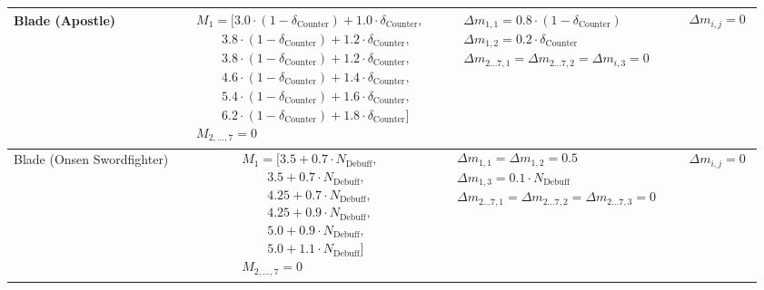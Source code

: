 \documentclass[twocolumn,10pt]{article}
\begin{document}
\begin{landscape}
\begin{longtable}{lccc}
Blade (Apostle) &
$\begin{aligned}
& M_1 = [3.0 \cdot (1-\delta_{\text{Counter}}) + 1.0 \cdot \delta_{\text{Counter}},\\
& \qquad 3.8 \cdot (1-\delta_{\text{Counter}}) + 1.2 \cdot \delta_{\text{Counter}},\\
& \qquad 3.8 \cdot (1-\delta_{\text{Counter}}) + 1.2 \cdot \delta_{\text{Counter}},\\
& \qquad 4.6 \cdot (1-\delta_{\text{Counter}}) + 1.4 \cdot \delta_{\text{Counter}},\\
& \qquad 5.4 \cdot (1-\delta_{\text{Counter}}) + 1.6 \cdot \delta_{\text{Counter}},\\
& \qquad 6.2 \cdot (1-\delta_{\text{Counter}}) + 1.8 \cdot \delta_{\text{Counter}}] \\
& M_{2,\dots,7} = 0
\end{aligned}$ &
$\begin{aligned}
& \Delta m_{1,1} = 0.8 \cdot (1-\delta_{\text{Counter}})\\
& \Delta m_{1,2} = 0.2 \cdot \delta_{\text{Counter}}\\
& \Delta m_{2\dots7,1} = \Delta m_{2\dots7,2} = \Delta m_{i,3} = 0
\end{aligned}$ &
$\begin{aligned}
& \Delta m_{i,j} = 0
\end{aligned}$ \\
\midrule

Blade (Onsen Swordfighter) &
$\begin{aligned}
& M_1 = [3.5 + 0.7 \cdot N_{\text{Debuff}},\\
& \qquad 3.5 + 0.7 \cdot N_{\text{Debuff}},\\
& \qquad 4.25 + 0.7 \cdot N_{\text{Debuff}},\\
& \qquad 4.25 + 0.9 \cdot N_{\text{Debuff}},\\
& \qquad 5.0 + 0.9 \cdot N_{\text{Debuff}},\\
& \qquad 5.0 + 1.1 \cdot N_{\text{Debuff}}] \\
& M_{2,\dots,7} = 0
\end{aligned}$ &
$\begin{aligned}
& \Delta m_{1,1} = \Delta m_{1,2} = 0.5 \\
& \Delta m_{1,3} = 0.1 \cdot N_{\text{Debuff}}\\
& \Delta m_{2\dots7,1} = \Delta m_{2\dots7,2} = \Delta m_{2\dots7,3} = 0
\end{aligned}$ &
$\begin{aligned}
& \Delta m_{i,j} = 0
\end{aligned}$ \\
\midrule


\end{longtable}
\end{landscape}
\end{document}
